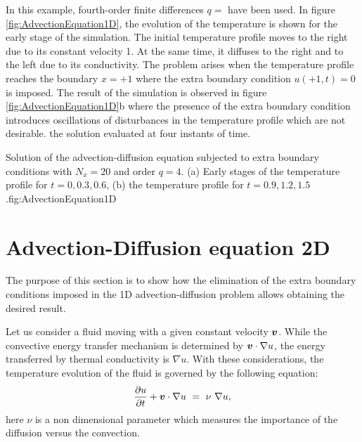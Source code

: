 In this example, fourth-order finite differences $ q=$ have been used.         
In figure \ref{fig:AdvectionEquation1D}, the evolution of the temperature is shown for the early stage of the simulation. 
The initial temperature profile moves to the right due to its constant velocity 1. At the same time, it diffuses to the right and to the left due to its conductivity. The problem arises when the temperature profile   reaches the boundary $ x = + 1$ where the extra boundary condition $u(+1,t) = 0$ is imposed. The result of the simulation is observed in figure  \ref{fig:AdvectionEquation1D}b where the presence of the extra boundary condition introduces oscillations of disturbances in the temperature profile which are not desirable.   
the solution evaluated at four instants of time.

       
\twographs
{}
{}
{Solution of the advection-diffusion equation subjected to extra boundary conditions with $ N_x = 20 $ and order $ q=4$. (a) Early stages of the temperature profile for $ t=0,0.3,0.6$, (b) the temperature profile for $ t=0.9,1.2,1.5$.}{fig:AdvectionEquation1D}


    
   
\newpage    
\section{Advection-Diffusion equation 2D}
 The purpose of this section is to show how the elimination of the extra boundary conditions imposed in the 1D advection-diffusion problem allows obtaining the desired result. 
 
 Let us consider a fluid moving with a given constant velocity $\boldsymbol{v} $. 
 While the convective energy transfer mechanism is determined by $  \boldsymbol{v} \cdot \nabla u $, the energy transferred by thermal  conductivity is $ \nabla u $. 
 With these considerations, the temperature evolution of the fluid is governed by the following equation:
 \begin{equation*}
        \frac{\partial u}{\partial t} +  \boldsymbol{v} \cdot \nabla u \ = \ \nu \ \nabla u, 
 \end{equation*}
 here $ \nu $ is a non dimensional parameter which measures the importance of the diffusion versus the convection.     
 
